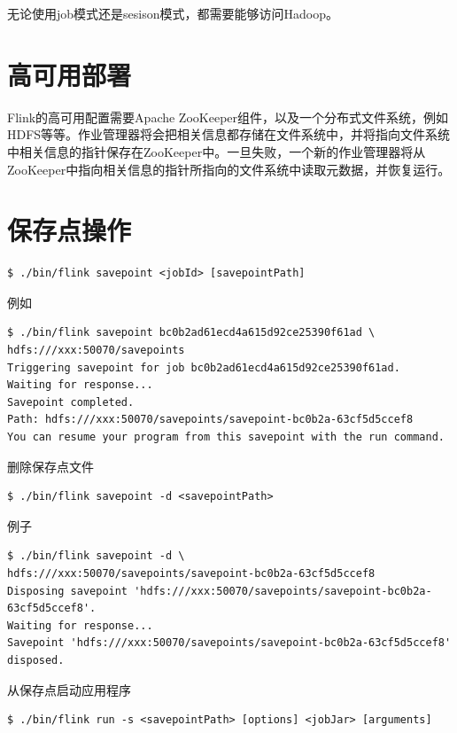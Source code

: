 \documentclass[cn,11pt,chinese]{elegantbook}
\begin{document}
无论使用job模式还是sesison模式，都需要能够访问Hadoop。

\section{高可用部署}

Flink的高可用配置需要Apache ZooKeeper组件，以及一个分布式文件系统，例如HDFS等等。作业管理器将会把相关信息都存储在文件系统中，并将指向文件系统中相关信息的指针保存在ZooKeeper中。一旦失败，一个新的作业管理器将从ZooKeeper中指向相关信息的指针所指向的文件系统中读取元数据，并恢复运行。

\section{ 保存点操作}

\begin{verbatim}
$ ./bin/flink savepoint <jobId> [savepointPath]
\end{verbatim}

例如

\begin{verbatim}
$ ./bin/flink savepoint bc0b2ad61ecd4a615d92ce25390f61ad \
hdfs:///xxx:50070/savepoints
Triggering savepoint for job bc0b2ad61ecd4a615d92ce25390f61ad.
Waiting for response...
Savepoint completed. 
Path: hdfs:///xxx:50070/savepoints/savepoint-bc0b2a-63cf5d5ccef8
You can resume your program from this savepoint with the run command.
\end{verbatim}

删除保存点文件

\begin{verbatim}
$ ./bin/flink savepoint -d <savepointPath>
\end{verbatim}

例子

\begin{verbatim}
$ ./bin/flink savepoint -d \
hdfs:///xxx:50070/savepoints/savepoint-bc0b2a-63cf5d5ccef8
Disposing savepoint 'hdfs:///xxx:50070/savepoints/savepoint-bc0b2a-63cf5d5ccef8'.
Waiting for response...
​Savepoint 'hdfs:///xxx:50070/savepoints/savepoint-bc0b2a-63cf5d5ccef8' disposed.
\end{verbatim}

从保存点启动应用程序

\begin{verbatim}
$ ./bin/flink run -s <savepointPath> [options] <jobJar> [arguments]
\end{verbatim}
\end{document}
